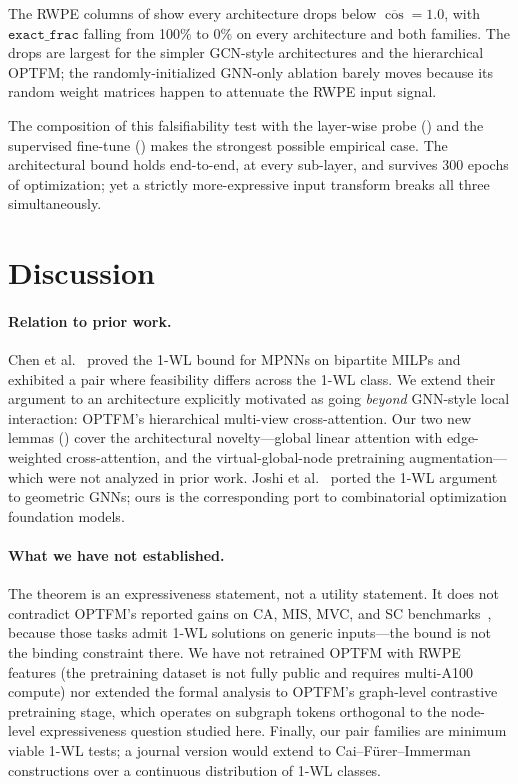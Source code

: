 \documentclass[11pt]{article}
\theoremstyle{plain}
\theoremstyle{definition}
\theoremstyle{remark}
\newcommand{\optfm}{\textsc{OPTFM}}
\newcommand{\rwpe}{\textsc{RWPE}}
\begin{document}
The \rwpe{} columns of  show every architecture drops below
$\overline{\cos}\!=\!1.0$, with $\texttt{exact\_frac}$ falling from 100\%
to 0\% on every architecture and both families. The drops are largest for
the simpler GCN-style architectures and the hierarchical \optfm{}; the
randomly-initialized GNN-only ablation barely moves because its random
weight matrices happen to attenuate the \rwpe{} input signal.

The composition of this falsifiability test with the layer-wise probe
() and the supervised fine-tune ()
makes the strongest possible empirical case. The architectural bound holds
end-to-end, at every sub-layer, and survives 300 epochs of optimization;
yet a strictly more-expressive input transform breaks all three
simultaneously.

\section{Discussion}
\label{sec:discussion}

\paragraph{Relation to prior work.}
Chen et al.~\cite{chen2023expressive} proved the 1-WL bound for MPNNs on
bipartite MILPs and exhibited a pair where feasibility differs across the
1-WL class. We extend their argument to an architecture explicitly motivated
as going \emph{beyond} GNN-style local interaction: \optfm{}'s hierarchical
multi-view cross-attention. Our two new lemmas
() cover the architectural novelty---global
linear attention with edge-weighted cross-attention, and the
virtual-global-node pretraining augmentation---which were not analyzed in
prior work. Joshi et al.~\cite{joshi2024} ported the 1-WL argument to
geometric GNNs; ours is the corresponding port to combinatorial
optimization foundation models.

\paragraph{What we have not established.}
The theorem is an expressiveness statement, not a utility statement. It
does not contradict \optfm{}'s reported gains on CA, MIS, MVC, and SC
benchmarks~\cite{yuan2025optfm}, because those tasks admit 1-WL solutions on
generic inputs---the bound is not the binding constraint there. We have not
retrained \optfm{} with \rwpe{} features (the pretraining dataset is not
fully public and requires multi-A100 compute) nor extended the formal
analysis to \optfm{}'s graph-level contrastive pretraining stage, which
operates on subgraph tokens orthogonal to the node-level expressiveness
question studied here. Finally, our pair families are minimum viable
1-WL tests; a journal version would extend to Cai--F\"urer--Immerman
constructions over a continuous distribution of 1-WL classes.
\end{document}

